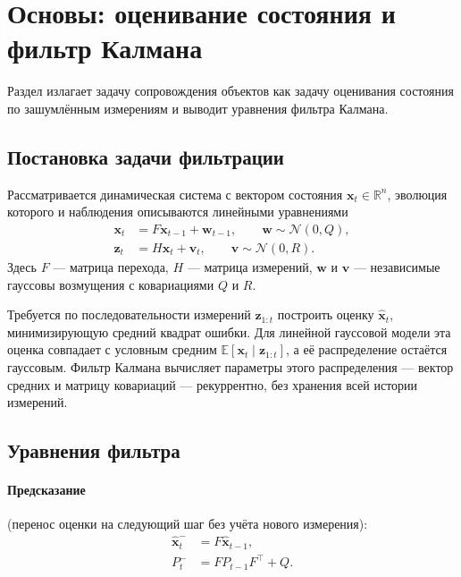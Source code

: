 \documentclass[11pt,a4paper]{article}
\theoremstyle{definition}
\theoremstyle{remark}
\begin{document}
\section{Основы: оценивание состояния и фильтр Калмана}
\label{sec:found-estimation}

Раздел излагает задачу сопровождения объектов как задачу оценивания состояния
по зашумлённым измерениям и выводит уравнения фильтра Калмана.

\subsection{Постановка задачи фильтрации}

Рассматривается динамическая система с вектором состояния
$\mathbf{x}_t \in \mathbb{R}^n$, эволюция которого и наблюдения описываются
линейными уравнениями
\begin{align}
  \mathbf{x}_t &= F \mathbf{x}_{t-1} + \mathbf{w}_{t-1}, \qquad
      \mathbf{w} \sim \mathcal{N}(0, Q), \\
  \mathbf{z}_t &= H \mathbf{x}_t + \mathbf{v}_t, \qquad
      \mathbf{v} \sim \mathcal{N}(0, R).
\end{align}
Здесь $F$ --- матрица перехода, $H$ --- матрица измерений, $\mathbf{w}$ и
$\mathbf{v}$ --- независимые гауссовы возмущения с ковариациями $Q$ и $R$.

Требуется по последовательности измерений $\mathbf{z}_{1:t}$ построить оценку
$\hat{\mathbf{x}}_t$, минимизирующую средний квадрат ошибки. Для линейной
гауссовой модели эта оценка совпадает с условным средним
$\mathbb{E}[\mathbf{x}_t \mid \mathbf{z}_{1:t}]$, а её распределение остаётся
гауссовым. Фильтр Калмана вычисляет параметры этого распределения ---
вектор средних и матрицу ковариаций --- рекуррентно, без хранения всей
истории измерений.

\subsection{Уравнения фильтра}

\paragraph{Предсказание} (перенос оценки на следующий шаг без учёта нового
измерения):
\begin{align}
  \hat{\mathbf{x}}^-_t &= F \hat{\mathbf{x}}_{t-1}, \\
  P^-_t &= F P_{t-1} F^\top + Q .
\end{align}
\end{document}
